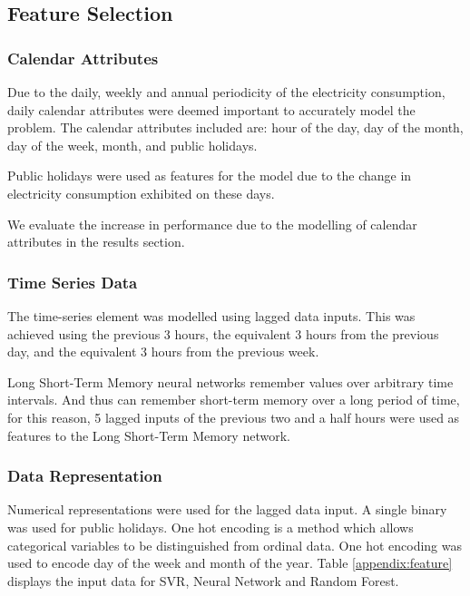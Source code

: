 \subsection{Feature Selection}

\subsubsection{Calendar Attributes}

Due to the daily, weekly and annual periodicity of the electricity consumption, daily calendar attributes were deemed important to accurately model the problem. The calendar attributes included are: hour of the day, day of the month, day of the week, month, and public holidays.

Public holidays were used as features for the model due to the change in electricity consumption exhibited on these days.

We evaluate the increase in performance due to the modelling of calendar attributes in the results section.

\subsubsection{Time Series Data}

The time-series element was modelled using lagged data inputs. This was achieved using the previous 3 hours, the equivalent 3 hours from the previous day, and the equivalent 3 hours from the previous week.

Long Short-Term Memory neural networks remember values over arbitrary time intervals. And thus can remember short-term memory over a long period of time, for this reason, 5 lagged inputs of the previous two and a half hours were used as features to the Long Short-Term Memory network.

\subsubsection{Data Representation}

Numerical representations were used for the lagged data input. A single binary was used for public holidays. One hot encoding is a method which allows categorical variables to be distinguished from ordinal data. One hot encoding was used to encode day of the week and month of the year. Table \ref{appendix:feature} displays the input data for SVR, Neural Network and Random Forest. 




